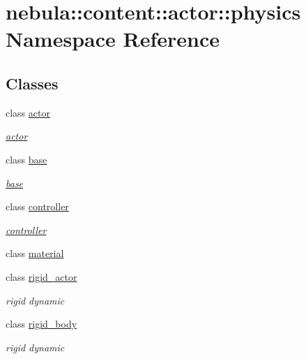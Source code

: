 \hypertarget{namespacenebula_1_1content_1_1actor_1_1physics}{
\section{nebula::content::actor::physics Namespace Reference}
\label{namespacenebula_1_1content_1_1actor_1_1physics}
}
\subsection*{Classes}
\begin{DoxyCompactItemize}
\item 
class \hyperlink{classnebula_1_1content_1_1actor_1_1physics_1_1actor}{actor}
\begin{DoxyCompactList}\small\item\em \hyperlink{classnebula_1_1content_1_1actor_1_1physics_1_1actor}{actor} \item\end{DoxyCompactList}\item 
class \hyperlink{classnebula_1_1content_1_1actor_1_1physics_1_1base}{base}
\begin{DoxyCompactList}\small\item\em \hyperlink{classnebula_1_1content_1_1actor_1_1physics_1_1base}{base} \item\end{DoxyCompactList}\item 
class \hyperlink{classnebula_1_1content_1_1actor_1_1physics_1_1controller}{controller}
\begin{DoxyCompactList}\small\item\em \hyperlink{classnebula_1_1content_1_1actor_1_1physics_1_1controller}{controller} \item\end{DoxyCompactList}\item 
class \hyperlink{classnebula_1_1content_1_1actor_1_1physics_1_1material}{material}
\item 
class \hyperlink{classnebula_1_1content_1_1actor_1_1physics_1_1rigid__actor}{rigid\_\-actor}
\begin{DoxyCompactList}\small\item\em rigid dynamic \item\end{DoxyCompactList}\item 
class \hyperlink{classnebula_1_1content_1_1actor_1_1physics_1_1rigid__body}{rigid\_\-body}
\begin{DoxyCompactList}\small\item\em rigid dynamic \item\end{DoxyCompactList}\item 

\end{DoxyCompactItemize}
